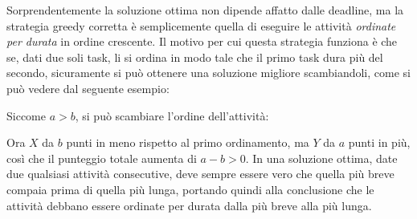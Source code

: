 Sorprendentemente la soluzione ottima non dipende affatto
dalle deadline, ma la strategia greedy corretta è semplicemente
quella di eseguire le attività \emph{ordinate per durata} in
ordine crescente.
Il motivo per cui questa strategia funziona è che
se, dati due soli task, li si ordina in modo tale che
il primo task dura più del secondo,
sicuramente si può ottenere una soluzione migliore scambiandoli,
come si può vedere dal seguente esempio:
\begin{center}
\end{center}
Siccome $a>b$, si può scambiare l'ordine dell'attività:
\begin{center}
\end{center}
Ora $X$ da $b$ punti in meno rispetto al primo ordinamento, ma $Y$ da $a$ punti in più,
così che il punteggio totale aumenta di $a-b > 0$.
In una soluzione ottima, date due qualsiasi attività consecutive,
deve sempre essere vero che quella più breve compaia prima di quella
più lunga, portando quindi alla conclusione che le attività debbano essere
ordinate per durata dalla più breve alla più lunga.

